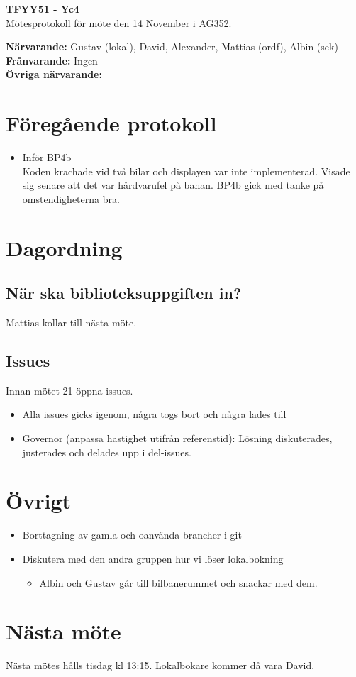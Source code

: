 \documentclass[11pt,a4paper]{article}
\begin{document}
    \begin{center}
        \textbf{\Large TFYY51 - Yc4} \\[0.2em]
        Mötesprotokoll för möte den 14 November i AG352.
    \end{center}
    \vspace{1em}
    \textbf{Närvarande:} Gustav (lokal), David, Alexander, Mattias (ordf), Albin (sek) \\[0.5em]
    \textbf{Frånvarande:} Ingen \\[0.5em]  %
    \textbf{Övriga närvarande:}

    \section*{Föregående protokoll}
    \begin{itemize}
        \item Inför BP4b \\
        Koden krachade vid två bilar och displayen var inte implementerad. Visade sig senare att det var hårdvarufel på banan. BP4b 	        gick med tanke på omstendigheterna bra.
    \end{itemize}

    \section*{Dagordning}
    \subsection*{ När ska biblioteksuppgiften in?}
    Mattias kollar till nästa möte.
    \subsection*{Issues}
    Innan mötet 21 öppna issues.
        \begin{itemize}
            \item Alla issues gicks igenom, några togs bort och några lades till 
	 \item Governor (anpassa hastighet utifrån referenstid): Lösning diskuterades, justerades och delades upp i del-issues.
        \end{itemize}

    \section*{Övrigt}
    \begin{itemize}
        \item Borttagning av gamla och oanvända brancher i git
        \item Diskutera med den andra gruppen hur vi löser lokalbokning
        \begin{itemize}
            \item Albin och Gustav går till bilbanerummet och snackar med dem.
        \end{itemize}
    \end{itemize}

    \section*{Nästa möte}
    Nästa mötes hålls tisdag kl 13:15. Lokalbokare kommer då vara  David.  
\end{document}
